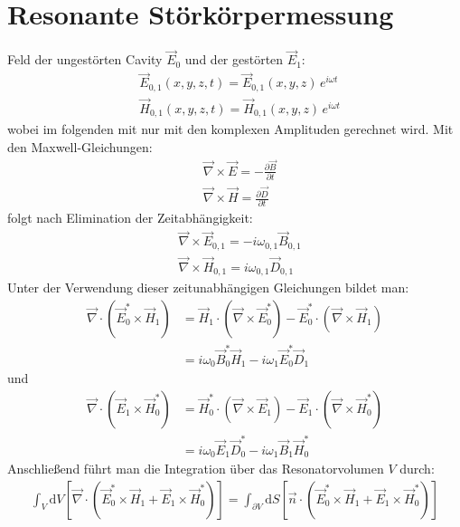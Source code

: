 \documentclass[11pt, a4paper]{scrbook}
\newcommand{\vnabla}{\vec{\nabla}}
\newcommand{\ve}{\vec{E}}
\newcommand{\vb}{\vec{B}}
\newcommand{\vh}{\vec{H}}
\newcommand{\vd}{\vec{D}}
\begin{document}
	\section{Resonante Störkörpermessung}
	Feld der ungestörten Cavity $\ve_0$ und der gestörten $\ve_1$:
	\begin{subequations}
		\begin{align}
		&\ve_{0,1}(x,y,z,t) = \ve_{0,1}(x,y,z) \, e^{i \omega t} \\
		&\vh_{0,1}(x,y,z,t) = \vh_{0,1}(x,y,z) \, e^{i \omega t}
		\end{align}
	\end{subequations}
	wobei im folgenden mit nur mit den komplexen Amplituden gerechnet wird.
	Mit den Maxwell-Gleichungen:
	\begin{subequations}
		\begin{align}
			&\vnabla \times \ve = - \frac{\partial \vb}{\partial t} \\
			&\vnabla \times \vh = \frac{\partial \vd}{\partial t}
		\end{align}
	\end{subequations}
	folgt nach Elimination der Zeitabhängigkeit:
	\begin{subequations}
		\begin{align}
			&\vnabla \times \ve_{0,1} = - i \omega_{0,1} \vb_{0,1} \\
			&\vnabla \times \vh_{0,1} = i \omega_{0,1} \vd_{0,1}
		\end{align}
	\end{subequations}
	Unter der Verwendung dieser zeitunabhängigen Gleichungen bildet man:
	\begin{align}
	\vnabla \cdot \left( \ve_0^* \times \vh_1\right) &= \vh_1 \cdot \left( \vnabla \times \ve_0^* \right) - \ve_0^* \cdot \left( \vnabla \times \vh_1 \right) \nonumber \\
	&= i \omega_0 \vb_0^* \vh_1 - i \omega_1 \ve_0^* \vd_1 \label{eq:e0h1}
	\end{align}
	und
	\begin{align}
		\vnabla \cdot \left( \ve_1 \times \vh_0^* \right) &= \vh_0^* \cdot \left( \vnabla \times \ve_1 \right) - \ve_1 \cdot \left( \vnabla \times \vh_0^* \right) \nonumber \\
		&= i \omega_0 \ve_1 \vd_0^* - i \omega_1 \vb_1 \vh_0^* \label{eq:e1h0}
	\end{align}
	Anschließend führt man die Integration über das Resonatorvolumen $V$ durch:
	\begin{align}
		\int_{V} \mathrm{d}V \left[ \vnabla \cdot \left( \ve_0^* \times \vh_1 + \ve_1 \times \vh_0^* \right) \right] = \int_{\partial V} \mathrm{d}S \left[ \vec{n} \cdot \left( \ve_0^* \times \vh_1 + \ve_1 \times \vh_0^* \right)\right] \label{eq:volint}
	\end{align}
\end{document}
